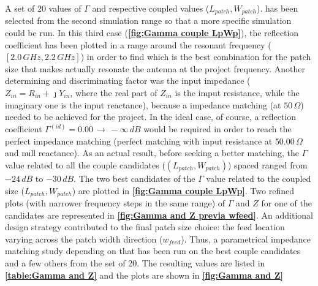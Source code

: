 \documentclass[12pt,a4paper,twocolumn]{article}
\begin{document}
{%
A set of 20 values of $\Gamma$ and respective coupled values ($L_{patch},W_{patch}$). has been selected from the second simulation range so that a more specific simulation could be run. In this third case (\textbf{\cref{fig:Gamma couple LpWp}}), the reflection coefficient has been plotted in a range around the resonant frequency ($[2.0\,GHz, 2.2\,GHz]$) in order to find which is the best combination for the patch size that makes actually resonate the antenna at the project frequency. Another determining and discriminating factor was the input impedance ($Z_{in}=R_{in}+\jmath Y_{in}$, where the real part of $Z_{in}$ is the imput resistance, while the imaginary one is the input reactance), because a impedance matching (at $50\,\Omega$) needed to be achieved for the project. In the ideal case, of course, a reflection coefficient $\Gamma^{(id)}=0.00\,\to\,-\infty\,dB$ would be required in order to reach the perfect impedance matching (perfect matching with input resistance at $50.00\,\Omega$ and null reactance). As an actual result, before seeking a better matching, the $\Gamma$ value related to all the couple candidates ($(L_{patch},W_{patch})$) spaced ranged from $-24\,dB$ to $-30\,dB$. The two best candidates of the $\Gamma$ value related to the coupled size ($L_{patch},W_{patch}$) are plotted in \textbf{\cref{fig:Gamma couple LpWp}}. Two refined plots (with narrower frequency steps in the same range) of $\Gamma$ and $Z$ for one of the candidates are represented in \textbf{\cref{fig:Gamma and Z previa wfeed}}. An additional design strategy contributed to the final patch size choice: the feed location varying across the patch width direction ($w_{feed}$). Thus, a parametrical impedance matching study depending on that has been run on the best couple candidates and a few others from the set of 20. The resulting values are listed in \textbf{\cref{table:Gamma and Z}} and the plots are shown in \textbf{\cref{fig:Gamma and Z}}


}
\end{document}
